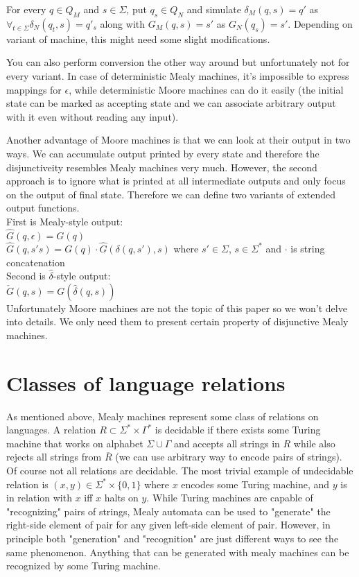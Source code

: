 \documentclass[12pt]{article}
\begin{document}
For every $q\in Q_M$ and $s\in\Sigma$, put $q_s\in Q_N$ and simulate $\delta_M(q,s)=q'$ as $\forall_{t\in\Sigma}\delta_N(q_t,s)=q'_s$ along with $G_M(q,s)=s'$ as $G_N(q_s) = s'$. Depending on variant of machine, this might need some slight modifications.

You can also perform conversion the other way around but unfortunately not for every variant. In case of deterministic Mealy machines, it's impossible to express mappings for $\epsilon$, while deterministic Moore machines can do it easily (the initial state can be marked as accepting state and we can associate arbitrary output with it even without reading any input).

Another advantage of Moore machines is that we can look at their output in two ways. We can accumulate output printed by every state and therefore the disjunctiveity resembles Mealy machines very much. However, the second approach is to ignore what is printed at all intermediate outputs and only focus on the output of final state. Therefore we can define two variants of extended output functions. \\
First is Mealy-style output: \\
$\hat{G}(q,\epsilon) = G(q)$ \\
$\hat{G}(q,s's) = G(q)\cdot\hat{G}(\delta(q,s'),s)$ where $s' \in \Sigma$, $s\in\Sigma^*$ and $\cdot$ is string concatenation \\
Second is $\hat{\delta}$-style output: \\
$\check{G}(q,s) = G(\hat{\delta}(q,s))$\\


Unfortunately Moore machines are not the topic of this paper so we won't delve  into details. We only need them to present certain property of disjunctive Mealy machines. 


\section{Classes of language relations} As mentioned above, Mealy machines represent some class of relations on languages. A relation $R \subset \Sigma^* \times \Gamma^*$ is decidable if there exists some Turing machine that works on alphabet $\Sigma \cup \Gamma$ and accepts all strings in $R$ while also rejects all strings from $\overline{R}$ (we can use arbitrary way to encode pairs of strings). Of course not all relations are decidable. The most trivial example of undecidable relation is $(x,y)  \in \Sigma^* \times \{0,1\}$ where  $x$ encodes some Turing machine, and $y$ is in relation with $x$ iff $x$ halts on $y$. While Turing machines are capable of "recognizing" pairs of strings, Mealy automata can be used to "generate" the right-side element of pair for any given left-side element of pair. However, in principle both "generation" and "recognition" are just different ways to see the same phenomenon. Anything that can be generated with mealy machines can be recognized by some Turing machine. 
\end{document}
